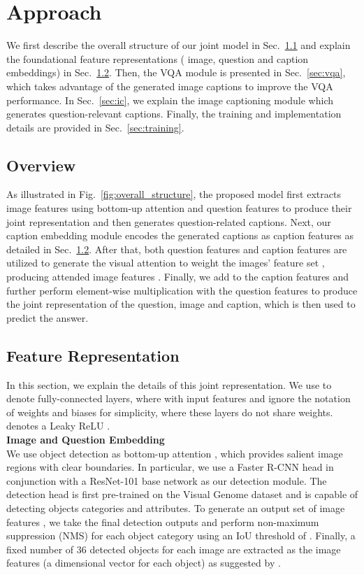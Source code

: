 \documentclass[11pt,a4paper]{article}
\begin{document}
\section{Approach}
We first describe the overall structure of our joint model in Sec.\
\ref{sec:overview} and explain the foundational feature representations ( image, question and caption embeddings) in Sec.\ \ref{sec:feat_repr}. Then, the VQA module is presented in Sec.\ \ref{sec:vqa}, which takes advantage of the generated image captions to improve the VQA performance. In Sec.\ \ref{sec:ic}, we explain the image captioning module which generates question-relevant captions. Finally, the training and implementation details are provided in Sec.\ \ref{sec:training}.



\subsection{Overview}
\label{sec:overview}
As illustrated in Fig.\ \ref{fig:overall_structure}, the proposed model first extracts image features  using bottom-up attention and question features  to produce their joint representation and then generates question-related captions. 
Next, our caption embedding module encodes the generated captions as caption features  as detailed in Sec.\ \ref{sec:feat_repr}. 
After that, both question features  and caption features  are utilized to generate the visual attention  to weight the images' feature set , producing attended image features . Finally, we add  to the caption features  and further perform element-wise multiplication with the question features  \cite{anderson2017bottom} to produce the joint representation of the question, image and caption, which is then used to predict the answer.


\subsection{Feature Representation}
\label{sec:feat_repr}
In this section, we explain the details of this joint representation. We use  to denote fully-connected layers, where   with input features  and ignore the notation of weights and biases for simplicity, where these  layers do not share weights.  denotes a Leaky ReLU \cite{he2015delving}.\\

\noindent\textbf{Image and Question Embedding}\\
We use object detection as bottom-up attention \cite{anderson2017bottom}, which provides salient image regions with clear boundaries. In particular, we use a Faster R-CNN head \cite{girshick2015fast} in conjunction with a ResNet-101 base network \cite{he2016deep} as our detection module. The detection head is first pre-trained on the Visual Genome dataset \cite{krishna2017visual} and is capable of detecting  objects categories and  attributes. To generate an output set of image features , we take the final detection outputs and perform non-maximum suppression (NMS) for each object category using an IoU threshold of . Finally, a fixed number of 36 detected objects for each image are extracted as the image features (a  dimensional vector for each object) as suggested by .
\end{document}
